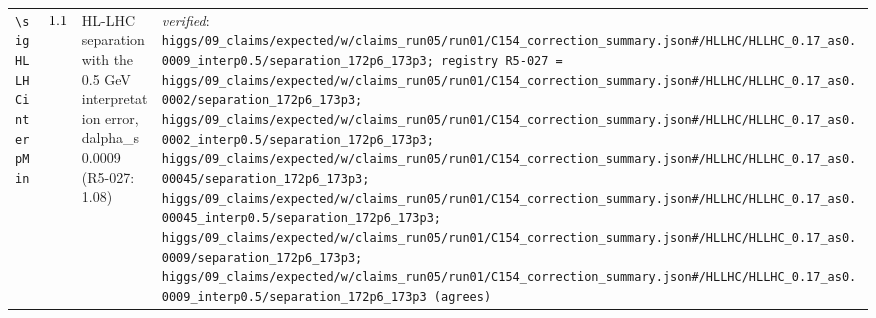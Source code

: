 {\begin{longtable}{@{}>{\raggedright\arraybackslash}p{}>{\raggedright\arraybackslash}p{}>{\raggedright\arraybackslash}p{}>{\raggedright\arraybackslash}p{}@{}}
\texttt{\textbackslash sigHLLHCinterpMin} & $1.1$ & HL-LHC separation with the 0.5 GeV interpretation error, dalpha\_\allowbreak{}s 0.0009 (R5-027: 1.08) & \emph{verified}: \texttt{higgs/\allowbreak{}09\_\allowbreak{}claims/\allowbreak{}expected/\allowbreak{}w/\allowbreak{}claims\_\allowbreak{}run05/\allowbreak{}run01/\allowbreak{}C154\_\allowbreak{}correction\_\allowbreak{}summary.json\#/\allowbreak{}HLLHC/\allowbreak{}HLLHC\_\allowbreak{}0.17\_\allowbreak{}as0.0009\_\allowbreak{}interp0.5/\allowbreak{}separation\_\allowbreak{}172p6\_\allowbreak{}173p3; registry R5-027 = higgs/\allowbreak{}09\_\allowbreak{}claims/\allowbreak{}expected/\allowbreak{}w/\allowbreak{}claims\_\allowbreak{}run05/\allowbreak{}run01/\allowbreak{}C154\_\allowbreak{}correction\_\allowbreak{}summary.json\#/\allowbreak{}HLLHC/\allowbreak{}HLLHC\_\allowbreak{}0.17\_\allowbreak{}as0.0002/\allowbreak{}separation\_\allowbreak{}172p6\_\allowbreak{}173p3; higgs/\allowbreak{}09\_\allowbreak{}claims/\allowbreak{}expected/\allowbreak{}w/\allowbreak{}claims\_\allowbreak{}run05/\allowbreak{}run01/\allowbreak{}C154\_\allowbreak{}correction\_\allowbreak{}summary.json\#/\allowbreak{}HLLHC/\allowbreak{}HLLHC\_\allowbreak{}0.17\_\allowbreak{}as0.0002\_\allowbreak{}interp0.5/\allowbreak{}separation\_\allowbreak{}172p6\_\allowbreak{}173p3; higgs/\allowbreak{}09\_\allowbreak{}claims/\allowbreak{}expected/\allowbreak{}w/\allowbreak{}claims\_\allowbreak{}run05/\allowbreak{}run01/\allowbreak{}C154\_\allowbreak{}correction\_\allowbreak{}summary.json\#/\allowbreak{}HLLHC/\allowbreak{}HLLHC\_\allowbreak{}0.17\_\allowbreak{}as0.00045/\allowbreak{}separation\_\allowbreak{}172p6\_\allowbreak{}173p3; higgs/\allowbreak{}09\_\allowbreak{}claims/\allowbreak{}expected/\allowbreak{}w/\allowbreak{}claims\_\allowbreak{}run05/\allowbreak{}run01/\allowbreak{}C154\_\allowbreak{}correction\_\allowbreak{}summary.json\#/\allowbreak{}HLLHC/\allowbreak{}HLLHC\_\allowbreak{}0.17\_\allowbreak{}as0.00045\_\allowbreak{}interp0.5/\allowbreak{}separation\_\allowbreak{}172p6\_\allowbreak{}173p3; higgs/\allowbreak{}09\_\allowbreak{}claims/\allowbreak{}expected/\allowbreak{}w/\allowbreak{}claims\_\allowbreak{}run05/\allowbreak{}run01/\allowbreak{}C154\_\allowbreak{}correction\_\allowbreak{}summary.json\#/\allowbreak{}HLLHC/\allowbreak{}HLLHC\_\allowbreak{}0.17\_\allowbreak{}as0.0009/\allowbreak{}separation\_\allowbreak{}172p6\_\allowbreak{}173p3; higgs/\allowbreak{}09\_\allowbreak{}claims/\allowbreak{}expected/\allowbreak{}w/\allowbreak{}claims\_\allowbreak{}run05/\allowbreak{}run01/\allowbreak{}C154\_\allowbreak{}correction\_\allowbreak{}summary.json\#/\allowbreak{}HLLHC/\allowbreak{}HLLHC\_\allowbreak{}0.17\_\allowbreak{}as0.0009\_\allowbreak{}interp0.5/\allowbreak{}separation\_\allowbreak{}172p6\_\allowbreak{}173p3 (agrees)} \\

\end{longtable}}

